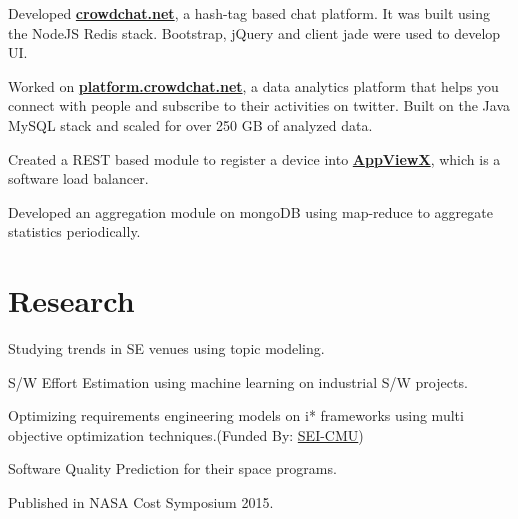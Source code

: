 \documentclass[]{bigfatnoob-resume}
\begin{document}
\begin{minipage}[t]{0.66\textwidth}
\begin{tightemize}
	\item Developed \textbf{\href{https://www.crowdchat.net/}{crowdchat.net}}, a hash-tag based chat platform. It was built using the NodeJS Redis stack. Bootstrap, jQuery and client jade were used to develop UI.
	\item Worked on \textbf{\href{https://platform.crowdchat.net}{platform.crowdchat.net}}, a data analytics platform that helps you connect with people and subscribe to their activities on twitter. Built on the Java MySQL stack and scaled for over 250 GB of analyzed data.
\end{tightemize}
\sectionsep

\begin{tightemize}
\item Created a REST based module to register a device into \textbf{\href{http://www.appviewx.com/}{AppViewX}}, which is a software load balancer.
\item Developed an aggregation module on mongoDB using map-reduce to aggregate statistics periodically.
\end{tightemize}
\sectionsep


\section{Research}
\begin{tightemize}
\item Studying trends in SE venues using topic modeling.
\item S/W Effort Estimation using machine learning on industrial S/W projects.
\item Optimizing requirements engineering models on i* frameworks using multi objective optimization techniques.(Funded By: \href{http://www.sei.cmu.edu/}{SEI-CMU})
\end{tightemize}
\sectionsep

\descript{}
\begin{tightemize}
\item Software Quality Prediction for their space programs.
\item Published in NASA Cost Symposium 2015.
\end{tightemize}
\sectionsep


\end{minipage}
\end{document}
